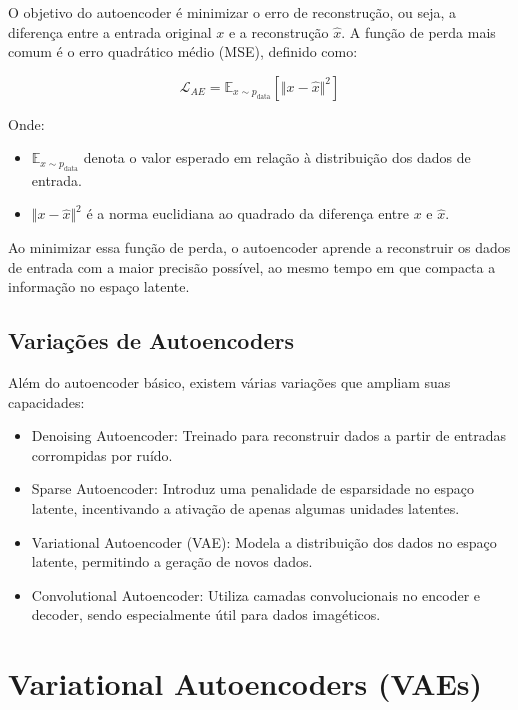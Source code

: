 \documentclass{tufte-handout}
\begin{document}
O objetivo do autoencoder é minimizar o erro de reconstrução, ou seja, a diferença entre a entrada original $x$ e a reconstrução $\hat{x}$. 
A função de perda mais comum é o erro quadrático médio (MSE), definido como:

\begin{equation}
    \mathcal{L}_{AE} = \mathbb{E}_{x \sim p_{\text{data}}} \left[ \Vert x - \hat{x} \Vert^2 \right]
\end{equation}

Onde:
\begin{itemize}
    \item $\mathbb{E}_{x \sim p_{\text{data}}}$ denota o valor esperado em relação à distribuição dos dados de entrada.
    \item $\Vert x - \hat{x} \Vert^2$ é a norma euclidiana ao quadrado da diferença entre $x$ e $\hat{x}$.
\end{itemize}


Ao minimizar essa função de perda, o autoencoder aprende a reconstruir os dados de entrada com a maior precisão possível, ao mesmo tempo em que compacta a informação no espaço latente.

\subsection{Variações de Autoencoders}

Além do autoencoder básico, existem várias variações que ampliam suas capacidades:
\begin{itemize}
    \item Denoising Autoencoder: Treinado para reconstruir dados a partir de entradas corrompidas por ruído.
    \item Sparse Autoencoder: Introduz uma penalidade de esparsidade no espaço latente, incentivando a ativação de apenas algumas unidades latentes.
    \item Variational Autoencoder (VAE): Modela a distribuição dos dados no espaço latente, permitindo a geração de novos dados.
    \item Convolutional Autoencoder: Utiliza camadas convolucionais no encoder e decoder, sendo especialmente útil para dados imagéticos.
\end{itemize}


\section{Variational Autoencoders (VAEs)}
\end{document}
